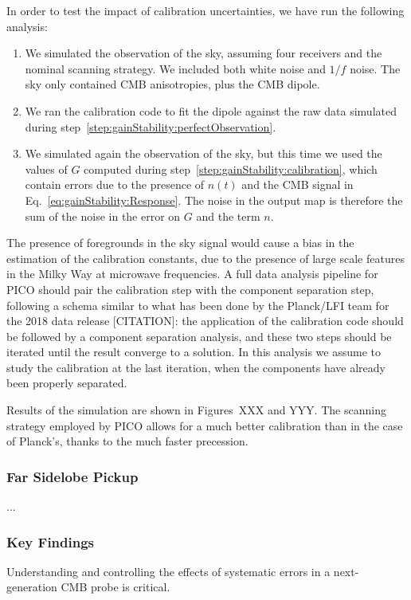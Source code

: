 \documentclass[PICOReport.tex]{subfiles}
\begin{document}
In order to test the impact of calibration uncertainties, we have run the following analysis:
\begin{enumerate}
\item\label{step:gainStability:perfectObservation} We simulated the observation of the sky, assuming four receivers and the nominal scanning strategy. We included both white noise and $1/f$ noise. The sky only contained CMB anisotropies, plus the CMB dipole.
\item\label{step:gainStability:calibration} We ran the calibration code to fit the dipole against the raw data simulated during step~\ref{step:gainStability:perfectObservation}.
\item\label{step:gainStability:imperfectObservation} We simulated again the observation of the sky, but this time we used the values of $G$ computed during step~\ref{step:gainStability:calibration}, which contain errors due to the presence of $n(t)$ and the CMB signal in Eq.~\eqref{eq:gainStability:Response}. The noise in the output map is therefore the sum of the noise in the error on $G$ and the term $n$.
\end{enumerate}
The presence of foregrounds in the sky signal would cause a bias in the estimation of the calibration constants, due to the presence of large scale features in the Milky Way at microwave frequencies. A full data analysis pipeline for PICO should pair the calibration step with the component separation step, following a schema similar to what has been done by the Planck/LFI team for the 2018 data release [CITATION]: the application of the calibration code should be followed by a component separation analysis, and these two steps should be iterated until the result converge to a solution. In this analysis we assume to study the calibration at the last iteration, when the components have already been properly separated.

Results of the simulation are shown in Figures~XXX and YYY. The scanning strategy employed by PICO allows for a much better calibration than in the case of Planck's, thanks to the much faster precession.

\subsubsection{Far Sidelobe Pickup}
\label{sec:fsl}
...

\subsubsection{Key Findings}
Understanding and controlling the effects of systematic errors in a
next-generation CMB probe is critical.
\end{document}
